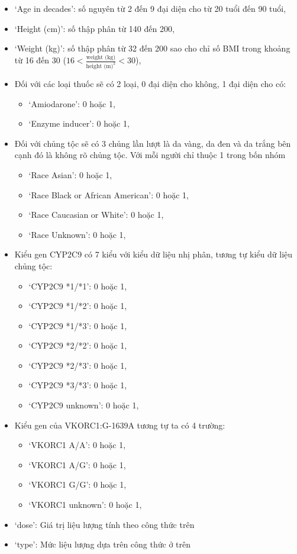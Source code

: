\documentclass[14pt,oneside]{scrbook}
\providecommand{\tightlist}{\setlength{\itemsep}{\smallskipamount}\setlength{\parskip}{\smallskipamount}}
\begin{document}
\begin{itemize}
\tightlist
\item
  `Age in decades': số nguyên từ 2 đến 9 đại diện cho từ 20 tuổi đến 90
  tuổi,
\item
  `Height (cm)': số thập phân từ 140 đến 200,
\item
  `Weight (kg)': số thập phân từ 32 đến 200 sao cho chỉ số BMI trong
  khoảng từ 16 đến 30 (\(16 < \frac{\text{weight (kg)}}{\text{height (m)}^2} < 30\)),
\item
  Đối với các loại thuốc sẽ có 2 loại, 0 đại diện cho không, 1 đại diện
  cho có:

  \begin{itemize}
  \tightlist
  \item
    `Amiodarone': 0 hoặc 1,
  \item
    `Enzyme inducer': 0 hoặc 1,
  \end{itemize}
\item
  Đối với chủng tộc sẽ có 3 chủng lần lượt là da vàng, da đen và da
  trắng bên cạnh đó là không rõ chủng tộc. Với mỗi người chỉ thuộc 1
  trong bốn nhóm

  \begin{itemize}
  \tightlist
  \item
    `Race Asian': 0 hoặc 1,
  \item
    `Race Black or African American': 0 hoặc 1,
  \item
    `Race Caucasian or White': 0 hoặc 1,
  \item
    `Race Unknown': 0 hoặc 1,
  \end{itemize}
\item
  Kiểu gen CYP2C9 có 7 kiểu với kiểu dữ liệu nhị phân, tương tự kiểu dữ
  liệu chủng tộc:

  \begin{itemize}
  \tightlist
  \item
    `CYP2C9 *1/*1': 0 hoặc 1,
  \item
    `CYP2C9 *1/*2': 0 hoặc 1,
  \item
    `CYP2C9 *1/*3': 0 hoặc 1,
  \item
    `CYP2C9 *2/*2': 0 hoặc 1,
  \item
    `CYP2C9 *2/*3': 0 hoặc 1,
  \item
    `CYP2C9 *3/*3': 0 hoặc 1,
  \item
    `CYP2C9 unknown': 0 hoặc 1,
  \end{itemize}
\item
  Kiểu gen của VKORC1:G-1639A tương tự ta có 4 trường:

  \begin{itemize}
  \tightlist
  \item
    `VKORC1 A/A': 0 hoặc 1,
  \item
    `VKORC1 A/G': 0 hoặc 1,
  \item
    `VKORC1 G/G': 0 hoặc 1,
  \item
    `VKORC1 unknown': 0 hoặc 1,
  \end{itemize}
\item
  `dose': Giá trị liệu lượng tính theo công thức trên
\item
  `type': Mức liệu lượng dựa trên công thức ở trên
\end{itemize}
\end{document}
